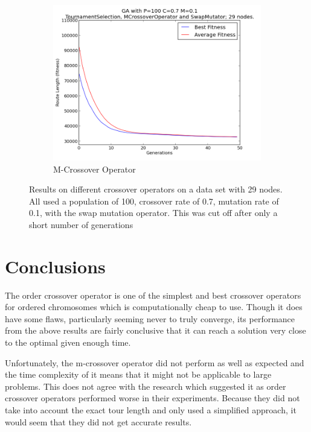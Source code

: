\documentclass[10pt, a4paper]{article}
\begin{document}
\begin{figure}[h]
\begin{subfigure}[b]{0.67\textwidth}
\includegraphics[width=\textwidth]{img/results/mcrossoveroperator/swapmutator/n29p100c07m01}
\caption{M-Crossover Operator}
\end{subfigure}
\caption{Results on different crossover operators on a data set with 29 nodes.
         All used a population of 100, crossover rate of 0.7, mutation rate of
         0.1, with the swap mutation operator. This was cut off after only a
         short number of generations}
\label{fig:early-cutoff-results}

\end{figure}


\newpage
\section{Conclusions}

The order crossover operator is one of the simplest and best crossover 
operators for ordered chromosomes which is computationally cheap to use. Though
it does have some flaws, particularly seeming never to truly converge, its
performance from the above results are fairly conclusive that it can reach a
solution very close to the optimal given enough time.

Unfortunately, the m-crossover operator did not perform as well as expected and
the time complexity of it means that it might not be applicable to large
problems. This does not agree with the research which suggested
it\cite{Mudaliar2013Unraveling} as order crossover operators performed worse in
their experiments. Because they did not take into account the exact tour length
and only used a simplified approach, it would seem that they did not get
accurate results. 
\end{document}
